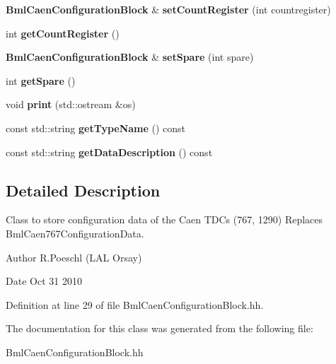 \begin{DoxyCompactItemize}
\item 
{\bf BmlCaenConfigurationBlock} \& {\bfseries setCountRegister} (int countregister)\label{classCALICE_1_1BmlCaenConfigurationBlock_a49de9d6d4578e37f78362ca9be910cae}

\item 
int {\bfseries getCountRegister} ()\label{classCALICE_1_1BmlCaenConfigurationBlock_a4b63566dafbbe73c046ea94962f28c4d}

\item 
{\bf BmlCaenConfigurationBlock} \& {\bfseries setSpare} (int spare)\label{classCALICE_1_1BmlCaenConfigurationBlock_a25eafb2a9abb905b2fcea1395d735225}

\item 
int {\bfseries getSpare} ()\label{classCALICE_1_1BmlCaenConfigurationBlock_a56e1badfdaed4148f5c89c045a9d8e2f}

\item 
void {\bfseries print} (std::ostream \&os)\label{classCALICE_1_1BmlCaenConfigurationBlock_a68dbb32906d68303dad6b5f4a8ba35c2}

\item 
const std::string {\bfseries getTypeName} () const \label{classCALICE_1_1BmlCaenConfigurationBlock_ae6b54fef6a2a397b27237787b4c1ad24}

\item 
const std::string {\bfseries getDataDescription} () const \label{classCALICE_1_1BmlCaenConfigurationBlock_a8bd06c4d35fb60d77e1bedb3a53a3523}

\end{DoxyCompactItemize}


\subsection{Detailed Description}
Class to store configuration data of the Caen TDCs (767, 1290) Replaces BmlCaen767ConfigurationData. \begin{DoxyAuthor}{Author}
R.Poeschl (LAL Orsay) 
\end{DoxyAuthor}
\begin{DoxyDate}{Date}
Oct 31 2010 
\end{DoxyDate}


Definition at line 29 of file BmlCaenConfigurationBlock.hh.

The documentation for this class was generated from the following file:\begin{DoxyCompactItemize}
\item 
BmlCaenConfigurationBlock.hh\end{DoxyCompactItemize}

